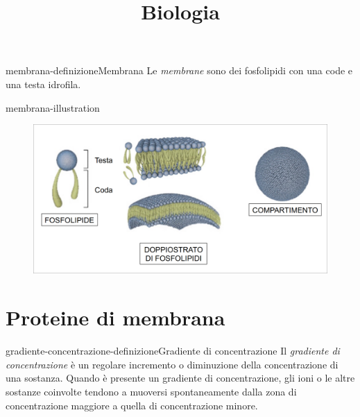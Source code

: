 \documentclass[preview]{standalone}
\begin{document}
\title{Biologia}
\genpage

\begin{snippetdefinition}{membrana-definizione}{Membrana}
    Le \textit{membrane} sono dei fosfolipidi con una code e una testa idrofila.
\end{snippetdefinition}


\begin{snippet}{membrana-illustration}
    \begin{center}
    \begin{figure}[h]
        \centering
        \includegraphics[width=\textwidth]{./resources/membrana.png}
    \end{figure}
    \end{center}
\end{snippet}


\section{Proteine di membrana}

\begin{snippetdefinition}{gradiente-concentrazione-definizione}{Gradiente di concentrazione}
    Il \textit{gradiente di concentrazione} è un regolare incremento o diminuzione della concentrazione di una sostanza. Quando è presente un gradiente di concentrazione, gli ioni o le altre sostanze coinvolte tendono a muoversi spontaneamente dalla zona di concentrazione maggiore a quella di concentrazione minore.
\end{snippetdefinition}

\end{document}
